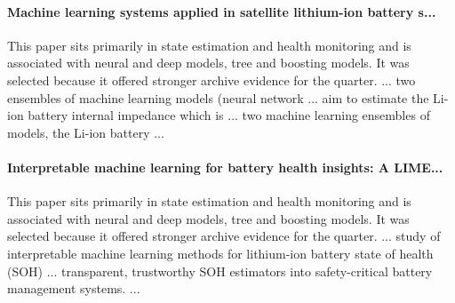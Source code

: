 \documentclass[conference]{IEEEtran}
\begin{document}
\paragraph{Machine learning systems applied in satellite lithium-ion battery s...} This paper sits primarily in state estimation and health monitoring and is associated with neural and deep models, tree and boosting models. It was selected because it offered stronger archive evidence for the quarter. ... two ensembles of machine learning models (neural network ... aim to estimate the Li-ion battery internal impedance which is ... two machine learning ensembles of models, the Li-ion battery ... \cite{machinelearningsystems2018}

\paragraph{Interpretable machine learning for battery health insights: A LIME...} This paper sits primarily in state estimation and health monitoring and is associated with neural and deep models, tree and boosting models. It was selected because it offered stronger archive evidence for the quarter. ... study of interpretable machine learning methods for lithium-ion battery state of health (SOH) ... transparent, trustworthy SOH estimators into safety-critical battery management systems. ... \cite{interpretablemachinelear2025}
\end{document}
